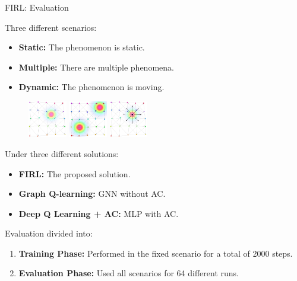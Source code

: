 \documentclass[presentation, 9pt,169]{beamer}\mode<presentation>{\usetheme{AMSBolognaFC}}
\begin{document}
\begin{frame}{FIRL: Evaluation}

    Three different scenarios:
    \begin{itemize}
      \item \textbf{Static:} The phenomenon is static.
      \item \textbf{Multiple:} There are multiple phenomena.
      \item \textbf{Dynamic:} The phenomenon is moving.
    \end{itemize}
    \begin{figure}
        \centering
        \includegraphics[width=0.15\textwidth]{img/base}
        \includegraphics[width=0.15\textwidth]{img/two}
        \includegraphics[width=0.15\textwidth]{img/moving}
    \end{figure}

    Under three different solutions:
    \begin{itemize}
      \item \textbf{FIRL:} The proposed solution.
      \item \textbf{Graph Q-learning:} GNN without AC.
      \item \textbf{Deep Q Learning + AC:} MLP with AC.
    \end{itemize}

Evaluation divided into:
  \begin{enumerate}
    \item \textbf{Training Phase:} Performed in the fixed scenario for a total of 2000 steps.
    \item \textbf{Evaluation Phase:} Used all scenarios for 64 different runs.
  \end{enumerate}
\end{frame}
\end{document}
